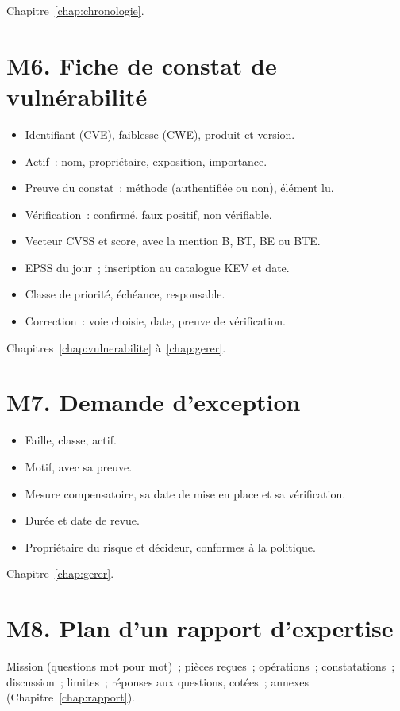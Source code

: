 \noindent Chapitre~\ref{chap:chronologie}.

\section*{M6. Fiche de constat de vulnérabilité}

\begin{itemize}
    \item Identifiant (CVE), faiblesse (CWE), produit et version.
    \item Actif~: nom, propriétaire, exposition, importance.
    \item Preuve du constat~: méthode (authentifiée ou non), élément lu.
    \item Vérification~: confirmé, faux positif, non vérifiable.
    \item Vecteur CVSS et score, avec la mention B, BT, BE ou BTE.
    \item EPSS du jour~; inscription au catalogue KEV et date.
    \item Classe de priorité, échéance, responsable.
    \item Correction~: voie choisie, date, preuve de vérification.
\end{itemize}

\noindent Chapitres~\ref{chap:vulnerabilite} à~\ref{chap:gerer}.

\section*{M7. Demande d'exception}

\begin{itemize}
    \item Faille, classe, actif.
    \item Motif, avec sa preuve.
    \item Mesure compensatoire, sa date de mise en place et sa
          vérification.
    \item Durée et date de revue.
    \item Propriétaire du risque et décideur, conformes à la politique.
\end{itemize}

\noindent Chapitre~\ref{chap:gerer}.

\section*{M8. Plan d'un rapport d'expertise}

Mission (questions mot pour mot)~; pièces reçues~; opérations~;
constatations~; discussion~; limites~; réponses aux questions, cotées~;
annexes (Chapitre~\ref{chap:rapport}).

